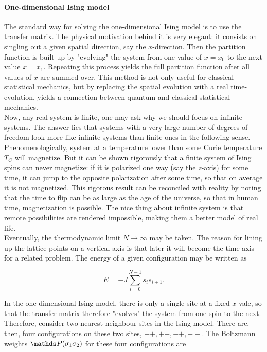 \documentclass{homework}
\begin{document}
\paragraph{\textbf{One-dimensional Ising model}}

The standard way for solving the one-dimensional Ising model is to use the transfer matrix. The physical motivation behind it is very elegant: it consists on singling out a given spatial direction, say the $x$-direction. Then the partition function is built up by "evolving" the system from one value of $x=x_0$ to the next value $x=x_1$. Repeating this process yields the full partition function after all values of $x$ are summed over. This method is not only useful for classical statistical mechanics, but by replacing the spatial evolution with a real time-evolution, yields a connection between quantum and classical statistical mechanics. \\

Now, any real system is finite, one may ask why we should focus on infinite systems. The answer lies that systems with a very large number of degrees of freedom look more like infinite systems than finite ones in the following sense.  Phenomenologically, system at a temperature lower than some Curie temperature $T_C$ will magnetize. But it can be shown rigorously that a finite system of Ising spins can never magnetize: if it is polarized one way (say the $z$-axis) for some time, it can jump to the opposite polarization after some time, so that on average it is not magnetized. This rigorous result can be reconciled with reality by noting that the time to flip can be as large as the age of the universe, so that in human time, magnetization is possible. The nice thing about infinite system is that remote possibilities are rendered impossible, making them a better model of real life. \\








Eventually, the thermodynamic limit $N \rightarrow \infty$ may be taken. The reason for lining up the lattice points on a vertical axis is that later it will become the time axis for a related problem. The energy of a given configuration may be written as 

\begin{equation}
    E = -J \sum_{i=0}^{N-1} s_i s_{i+1}.
\end{equation}

In the one-dimensional Ising model, there is only a single site at a fixed $x$-vale, so that the transfer matrix therefore "evolves" the system from one spin to the next. Therefore, consider two nearest-neighbour sites in the Ising model. There are, then, four configurations on these two sites, $++, +-, -+, --$. The Boltzmann weights $\prob(\sigma_1 \sigma_2)$ for these four configurations are 
\end{document}

